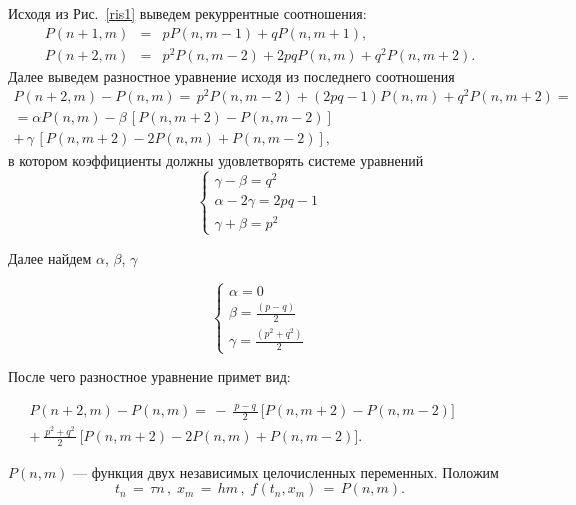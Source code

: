 \documentclass[a4paper]{report}
\begin{document}
Исходя из Рис.~\ref{ris1} выведем рекуррентные соотношения:
\begin{eqnarray}
P(n+1,m) &=& p P(n,m-1) + q P(n,m+1),\nonumber\\
P(n+2,m) &=& p^2P(n,m-2) + 2pqP(n,m)+q^2P(n,m+2). \nonumber
\end{eqnarray}
Далее выведем разностное уравнение исходя из последнего соотношения
\begin{multline}
P(n+2,m)-P(n,m) =\,p^2P(n,m-2)+(2pq-1)P(n,m)+q^2P(n,m+2) =
\\=\alpha{}P(n,m)-\beta\,[P(n,m+2)-P(n,m-2)]\\
+\,\gamma\,[P(n,m+2) -2P(n,m)+P(n,m-2)],\nonumber
\end{multline}
в котором коэффициенты должны удовлетворять системе уравнений
\begin{equation*}
\begin{cases}
\gamma-\beta=q^2
   \\
\alpha-2\gamma=2pq-1
   \\
\gamma+\beta=p^2
 \end{cases}
\end{equation*}

Далее найдем $\alpha$, $\beta$, $\gamma$

\begin{equation*}
\begin{cases}
\alpha=0
   \\
\beta= {\frac{(p-q)}{2}}
   \\
\gamma= {\frac{(p^2+q^2)}{2}}
 \end{cases}
\end{equation*}

После чего разностное уравнение примет вид:

\begin{multline}\label{dP}
P(n+2,m)-P(n,m) =\,-\,\frac{\,p-q\,}{2}\, \big[P(n,m+2)-P(n,m-2)\big]\qquad\;\;\\
+\,\frac{\,p^2+q^2\,}{2}\, \big[P(n,m+2)-2P(n,m)+P(n,m-2)\big].
\end{multline}

$P(n,m)$ --- функция двух независимых целочисленных переменных. Положим
\begin{equation}\label{}
t_n\,=\,\tau{}n\,,\; x_m\,=\,hm\,,\; f(t_n,x_m)\,=\,P(n,m).
\nonumber
\end{equation}
\end{document}
